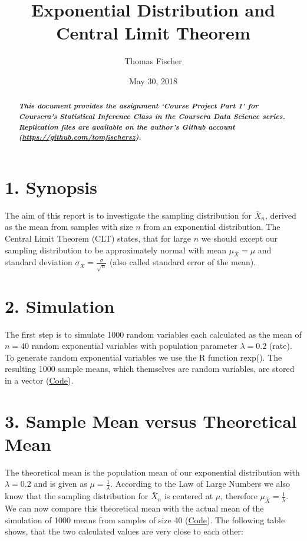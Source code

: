 \documentclass[]{article}
\title{Exponential Distribution and Central Limit Theorem}
\author{Thomas Fischer}
\date{May 30, 2018}
\begin{document}
\maketitle
\begin{abstract}
\textbf{\emph{This document provides the assignment `Course Project Part
1' for Coursera's Statistical Inference Class in the Coursera Data
Science series. Replication files are available on the author's Github
account (\url{https://github.com/tomfischersz}).}}
\end{abstract}

\section{1. Synopsis}\label{synopsis}

The aim of this report is to investigate the sampling distribution for
\(\bar X_n\), derived as the mean from samples with size \(n\) from an
exponential distribution. The Central Limit Theorem (CLT) states, that
for large \(n\) we should except our sampling distribution to be
approximately normal with mean \(\mu_{\bar X} =\mu\) and standard
deviation \(\sigma_{\bar X} =\)\(\frac{\sigma}{\sqrt{n}}\) (also called
standard error of the mean).

\section{2. Simulation}\label{simulation}

The first step is to simulate 1000 random variables each calculated as
the mean of \(n = 40\) random exponential variables with population
parameter \(\lambda = 0.2\) (rate). To generate random exponential
variables we use the R function rexp(). The resulting 1000 sample means,
which themselves are random variables, are stored in a vector
(\protect\hyperlink{Appendix_1}{Code}).

\section{3. Sample Mean versus Theoretical
Mean}\label{sample-mean-versus-theoretical-mean}

The theoretical mean is the population mean of our exponential
distribution with \(\lambda = 0.2\) and is given as
\(\mu = \frac{1}{\lambda}\). According to the Law of Large Numbers we
also know that the sampling distribution for \(\bar X_n\) is centered at
\(\mu\), therefore \(\mu_{\bar X} = \frac{1}{\lambda}\). We can now
compare this theoretical mean with the actual mean of the simulation of
1000 means from samples of size 40
(\protect\hyperlink{Appendix_2}{Code}). The following table shows, that
the two calculated values are very close to each other:
\end{document}
